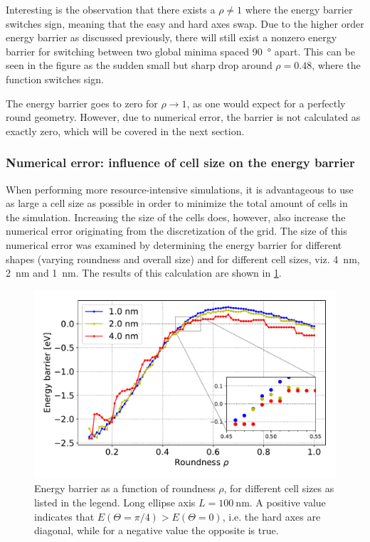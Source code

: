 \documentclass[11pt,a4paper,english]{article}
\begin{document}
Interesting is the observation that there exists a $\rho \neq 1$ where the energy barrier switches sign, meaning that the easy and hard axes swap. Due to the higher order energy barrier as discussed previously, there will still exist a nonzero energy barrier for switching between two global minima spaced \SI{90}{\degree} apart. This can be seen in the figure as the sudden small but sharp drop around $\rho = 0.48$, where the function switches sign.

The energy barrier goes to zero for $\rho \rightarrow 1$, as one would expect for a perfectly round geometry. However, due to numerical error, the barrier is not calculated as exactly zero, which will be covered in the next section.

\subsubsection{Numerical error: influence of cell size on the energy barrier}
When performing more resource-intensive simulations, it is advantageous to use as large a cell size as possible in order to minimize the total amount of cells in the simulation. Increasing the size of the cells does, however, also increase the numerical error originating from the discretization of the grid. The size of this numerical error was examined by determining the energy barrier for different shapes (varying roundness and overall size) and for different cell sizes, viz. \SI{4}{\nano\metre}, \SI{2}{\nano\metre} and \SI{1}{\nano\metre}. The results of this calculation are shown in \cref{fig:barrier-cell_size-100nm}. \par
\begin{figure}
    \centering
    \includegraphics[width=0.9\columnwidth]{Figures/biaxial_island/Barrier/Plus_100_0.1-1_aPi128_B0.01_cell1,2,4nm.pdf}
    \caption{Energy barrier as a function of roundness $\rho$, for different cell sizes as listed in the legend. Long ellipse axis $L=\SI{100}{\nano\metre}$. A positive value indicates that $E(\Theta=\pi/4) > E(\Theta=0)$, i.e. the hard axes are diagonal, while for a negative value the opposite is true.}
    \label{fig:barrier-cell_size-100nm}
\end{figure}
\end{document}
